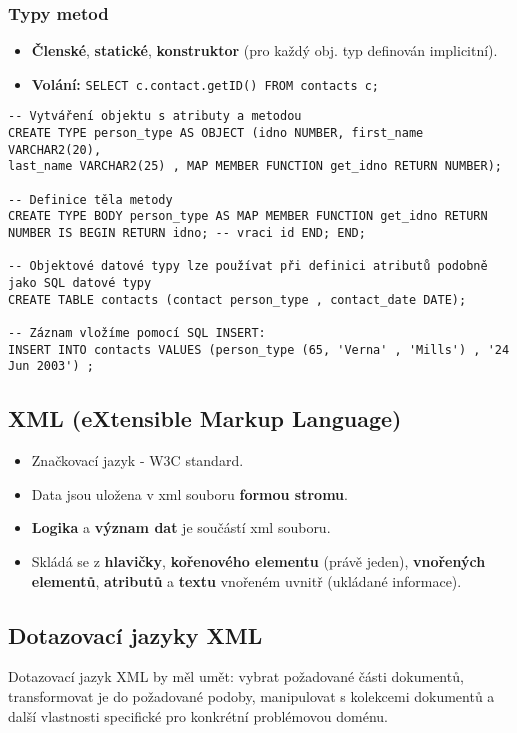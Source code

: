 \subsubsection{Typy metod}
\begin{itemize}
	\item \textbf{Členské}, \textbf{statické}, \textbf{konstruktor} (pro každý obj. typ definován implicitní).
	\item \textbf{Volání:} \texttt{SELECT c.contact.getID() FROM contacts c;}
\end{itemize}

\begin{verbatim}
-- Vytváření objektu s atributy a metodou
CREATE TYPE person_type AS OBJECT (idno NUMBER, first_name VARCHAR2(20), 
last_name VARCHAR2(25) , MAP MEMBER FUNCTION get_idno RETURN NUMBER);

-- Definice těla metody
CREATE TYPE BODY person_type AS MAP MEMBER FUNCTION get_idno RETURN 
NUMBER IS BEGIN RETURN idno; -- vraci id END; END;

-- Objektové datové typy lze používat při definici atributů podobně jako SQL datové typy
CREATE TABLE contacts (contact person_type , contact_date DATE);

-- Záznam vložíme pomocí SQL INSERT:
INSERT INTO contacts VALUES (person_type (65, 'Verna' , 'Mills') , '24 Jun 2003') ;
\end{verbatim}

\subsection{XML (eXtensible Markup Language)}
\begin{itemize}
	\item Značkovací jazyk - W3C standard.
	\item Data jsou uložena v xml souboru \textbf{formou stromu}.
	\item \textbf{Logika} a \textbf{význam dat} je součástí xml souboru.
	\item Skládá se z \textbf{hlavičky}, \textbf{kořenového elementu} (právě jeden), \textbf{vnořených elementů}, \textbf{atributů} a \textbf{textu} vnořeném uvnitř (ukládané informace).
\end{itemize}

\subsection{Dotazovací jazyky XML}
Dotazovací jazyk XML by měl umět: vybrat požadované části dokumentů, transformovat je do požadované podoby, manipulovat s kolekcemi dokumentů a další vlastnosti specifické pro konkrétní problémovou doménu.

